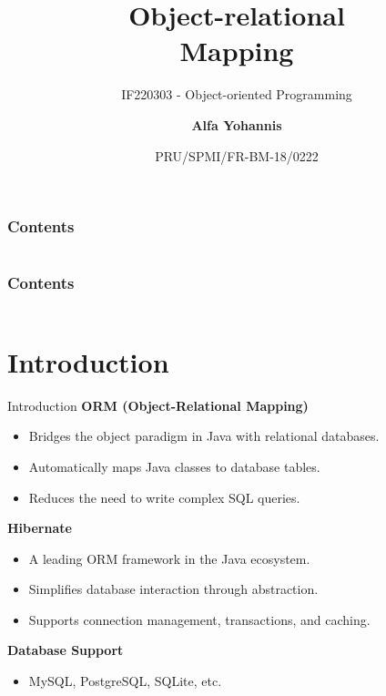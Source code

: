 \documentclass[aspectratio=169, table]{beamer}
\subtitle{IF220303 - Object-oriented Programming}
\title{\Huge Object-relational\\Mapping}
\date[Serial]{\scriptsize {PRU/SPMI/FR-BM-18/0222}}
\author[Pradita]{\small {\textbf{Alfa Yohannis}}}
\begin{document}
	
	\frame{\titlepage}
	
\begin{frame}[fragile]
	\frametitle{Contents}
	
	\begin{columns}[t]
		\tableofcontents[sections={1-2}]
		
		\tableofcontents[sections={3-4}]
	\end{columns}
\end{frame}

\begin{frame}[fragile]
	\frametitle{Contents}
	
	\begin{columns}[t]
		\tableofcontents[sections={5-6}]
		
		\tableofcontents[sections={7-8}]
	\end{columns}
\end{frame}

\section{Introduction}
\begin{frame}{Introduction}
	\vspace{20pt}
	\textbf{ORM (Object-Relational Mapping)}
	\begin{itemize}
		\item Bridges the object paradigm in Java with relational databases.
		\item Automatically maps Java classes to database tables.
		\item Reduces the need to write complex SQL queries.
	\end{itemize}
	
	\textbf{Hibernate}
	\begin{itemize}
		\item A leading ORM framework in the Java ecosystem.
		\item Simplifies database interaction through abstraction.
		\item Supports connection management, transactions, and caching.
	\end{itemize}
	
	\textbf{Database Support}
	\begin{itemize}
		\item MySQL, PostgreSQL, SQLite, etc.
	\end{itemize}
\end{frame}
\end{document}
